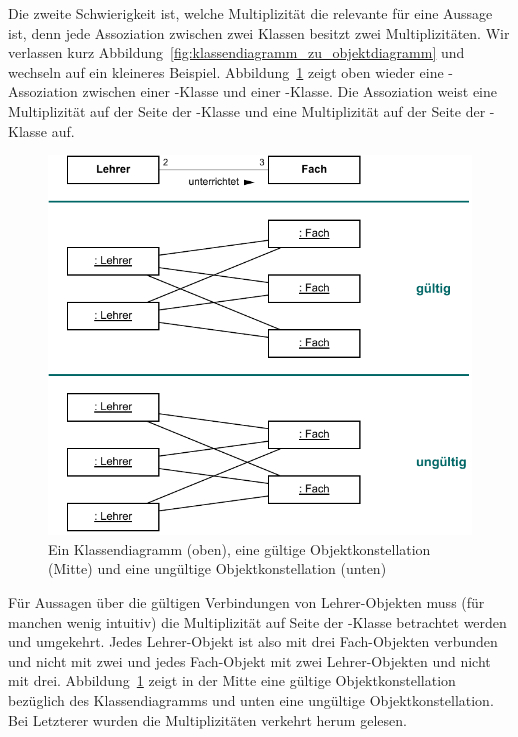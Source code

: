 \vspace{1.4mm} %

Die zweite Schwierigkeit ist, welche Multiplizität die relevante für eine Aussage ist, denn jede Assoziation zwischen zwei Klassen besitzt zwei Multiplizitäten. Wir verlassen kurz Abbildung~\ref{fig:klassendiagramm_zu_objektdiagramm} und wechseln auf ein kleineres Beispiel. Abbildung~\ref{fig:klassendiagramm_und_objektkonstellationen} zeigt oben wieder eine -Assoziation zwischen einer -Klasse und einer -Klasse. Die Assoziation weist eine Multiplizität  auf der Seite der -Klasse und eine Multiplizität  auf der Seite der -Klasse auf. 

\pagebreak %

\begin{figure}[h!]
	\vspace{8mm} %
	\centering
	\includegraphics{Bilder/Kapitel-4/objektkonstellation_gueltig_ungueltig.pdf}
	\caption[Klassendiagramm, gültige und ungültige Objektkonstellation]{Ein Klassendiagramm (oben), eine gültige Objektkonstellation (Mitte) und eine ungültige Objektkonstellation (unten)}
	\label{fig:klassendiagramm_und_objektkonstellationen}
\end{figure}

Für Aussagen über die gültigen Verbindungen von Lehrer-Objekten muss (für manchen wenig intuitiv) die Multiplizität auf Seite der -Klasse betrachtet werden und umgekehrt. Jedes Lehrer-Objekt ist also mit drei Fach-Objekten verbunden und nicht mit zwei und jedes Fach-Objekt mit zwei Lehrer-Objekten und nicht mit drei. Abbildung~\ref{fig:klassendiagramm_und_objektkonstellationen} zeigt in der Mitte eine gültige Objektkonstellation bezüglich des Klassendiagramms und unten eine ungültige Objektkonstellation. Bei Letzterer wurden die Multiplizitäten verkehrt herum gelesen.

